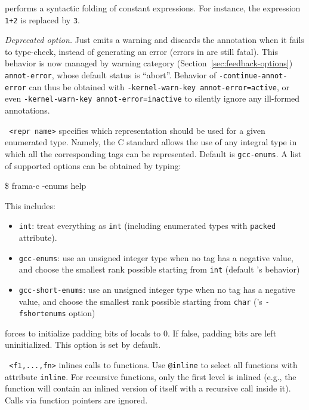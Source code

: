 \begin{description}
\item {} performs a syntactic folding of
constant expressions. For instance,
the expression \texttt{1+2} is replaced by \texttt{3}.

\item {} \emph{Deprecated option.}
  Just emits a warning and discards the annotation when it fails to type-check,
  instead of generating an error (errors in \C are still fatal). This behavior
  is now managed by warning category (Section~\ref{sec:feedback-options})
\texttt{annot-error}, whose default status is ``abort''. Behavior of
\texttt{-continue-annot-error} can thus be obtained with
\texttt{-kernel-warn-key annot-error=active}, or even
\texttt{-kernel-warn-key annot-error=inactive} to silently ignore any ill-formed
annotations.

\item \texttt{ <repr name>} specifies which representation
should be used for a given enumerated type. Namely, the C standard allows the use
of any integral type in which all the corresponding tags can be represented.
Default is \texttt{gcc-enums}. A list of supported
options can be obtained by typing:
\begin{frama-c-commands}
\$ frama-c -enums help
\end{frama-c-commands}
This includes:
\begin{itemize}
\item \texttt{int}: treat everything as \texttt{int} (including enumerated types
with \texttt{packed} attribute).
\item \texttt{gcc-enums}: use an unsigned integer type when no tag has a
negative value, and choose the smallest rank possible starting from \texttt{int}
(default \gcc's behavior)
\item \texttt{gcc-short-enums}: use an unsigned integer type when no tag has
a negative value, and choose the smallest rank possible starting from
\texttt{char} (\gcc's \texttt{-fshortenums} option)
\end{itemize}

\item {} forces to initialize padding
  bits of locals to 0. If false, padding bits are left uninitialized. This
  option is set by default.

\item \texttt{ <f1,...,fn>} inlines calls to
  functions. Use \texttt{@inline} to select all functions with attribute
  \texttt{inline}.
  For recursive functions, only the first level
  is inlined (e.g., the function will contain an inlined version of itself with
  a recursive call inside it). Calls via function pointers are ignored.


\end{description}
